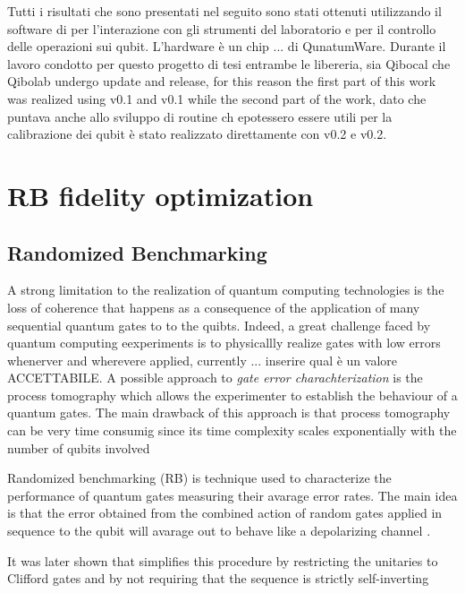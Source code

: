 Tutti i risultati che sono presentati nel seguito sono stati ottenuti utilizzando il software di \Qibolab per l'interazione con gli strumenti del laboratorio e \Qibocal per il controllo delle operazioni sui qubit.
L'hardware è un chip ... di QunatumWare.
Durante il lavoro condotto per questo progetto di tesi entrambe le libereria, sia Qibocal che Qibolab undergo update and release, for this reason the first part of this work was realized using \Qibocal v0.1 and \Qibolab v0.1 while the second part of the work, 
dato che puntava anche allo sviluppo di routine ch epotessero essere utili per la calibrazione dei qubit è stato realizzato direttamente con \Qibocal v0.2 e \Qibolab v0.2. 

\section{RB fidelity optimization}

\subsection{Randomized Benchmarking}\label{RBsection}
A strong limitation to the realization of quantum computing technologies is the loss of coherence that happens as a consequence of the application of many sequential quantum gates to to the quibts.
Indeed, a great challenge faced by quantum computing eexperiments is to physicallly realize gates with low errors whenerver and wherevere applied, currently ... inserire qual è un valore ACCETTABILE.
A possible approach to \textit{gate error charachterization} is the process tomography which allows the experimenter to establish the behaviour of a quantum gates. 
The main drawback of this approach is that process tomography can be very time consumig since its time complexity scales exponentially with the number of qubits involved \cite{QPTomography}

Randomized benchmarking (RB) is technique used to characterize the performance of quantum gates measuring their avarage error rates.
The main idea is that the error obtained from the combined action of random gates applied in sequence to the qubit will avarage out to behave like a depolarizing channel \cite{Emerson_2005_RB}.

It was later shown that simplifies this procedure by restricting the unitaries to Clifford gates and by not requiring that the sequence is strictly self-inverting

